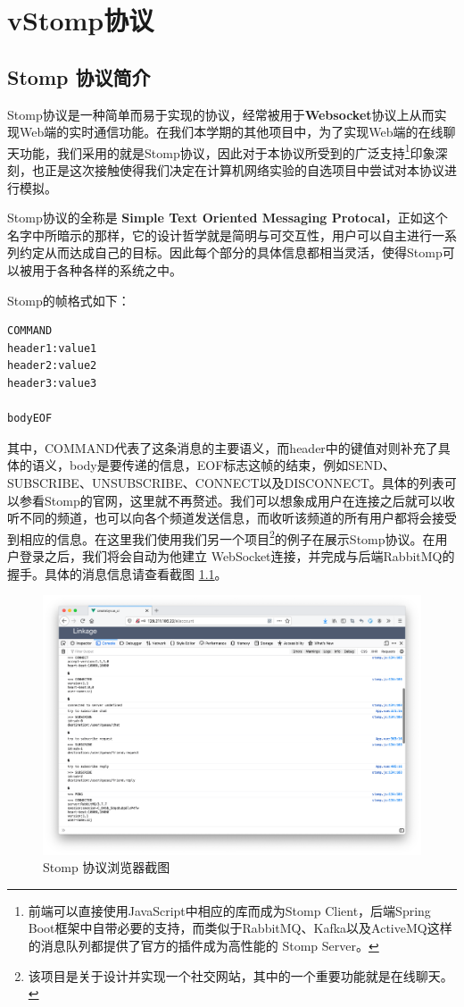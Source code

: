 \documentclass{ctexrep}
\begin{document}
	
	\chapter{vStomp协议}
	\section{Stomp 协议简介}
	Stomp协议是一种简单而易于实现的协议，经常被用于\textbf{Websocket}协议上从而实现Web端的实时通信功能。在我们本学期的其他项目中，为了实现Web端的在线聊天功能，我们采用的就是Stomp协议，因此对于本协议所受到的广泛支持\footnote{前端可以直接使用JavaScript中相应的库而成为Stomp Client，后端Spring Boot框架中自带必要的支持，而类似于RabbitMQ、Kafka以及ActiveMQ这样的消息队列都提供了官方的插件成为高性能的 Stomp Server。}印象深刻，也正是这次接触使得我们决定在计算机网络实验的自选项目中尝试对本协议进行模拟。
	
	Stomp协议的全称是 \textbf{Simple Text Oriented Messaging Protocal}，正如这个名字中所暗示的那样，它的设计哲学就是简明与可交互性，用户可以自主进行一系列约定从而达成自己的目标。因此每个部分的具体信息都相当灵活，使得Stomp可以被用于各种各样的系统之中。
	
	Stomp的帧格式如下：
	\begin{lstlisting}
COMMAND
header1:value1
header2:value2
header3:value3

bodyEOF
	\end{lstlisting}
	
	其中，COMMAND代表了这条消息的主要语义，而header中的键值对则补充了具体的语义，body是要传递的信息，EOF标志这帧的结束，例如SEND、SUBSCRIBE、UNSUBSCRIBE、CONNECT以及DISCONNECT。具体的列表可以参看Stomp的官网，这里就不再赘述。我们可以想象成用户在连接之后就可以收听不同的频道，也可以向各个频道发送信息，而收听该频道的所有用户都将会接受到相应的信息。在这里我们使用我们另一个项目\footnote{该项目是关于设计并实现一个社交网站，其中的一个重要功能就是在线聊天。}的例子在展示Stomp协议。在用户登录之后，我们将会自动为他建立 WebSocket连接，并完成与后端RabbitMQ的握手。具体的消息信息请查看截图 \ref{fig:stompdemo}。
	\begin{figure}[H]
		\centering
		\includegraphics[width=0.9\linewidth]{img/stompDemo}
		\caption{Stomp 协议浏览器截图}
		\label{fig:stompdemo}
	\end{figure}
\end{document}
